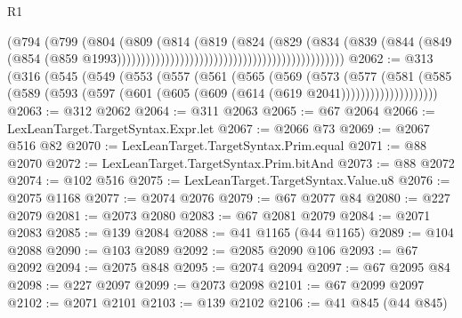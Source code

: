 \begin{lexlean}{R1}
\begin{coremodule}
                                                                      (@794
                                                                        (@799
                                                                          (@804
                                                                            (@809
                                                                              (@814
                                                                                (@819
                                                                                  (@824
                                                                                    (@829
                                                                                      (@834
                                                                                        (@839
                                                                                          (@844
                                                                                            (@849
                                                                                              (@854
                                                                                                (@859
                                                                                                  @1993)))))))))))))))))))))))))))))))))))))))))))))))
@2062 := @313
    (@316
      (@545
        (@549
          (@553
            (@557
              (@561
                (@565
                  (@569
                    (@573
                      (@577
                        (@581
                          (@585
                            (@589
                              (@593 (@597 (@601 (@605 (@609 (@614 (@619 @2041))))))))))))))))))))
@2063 := @312 @2062
@2064 := @311 @2063
@2065 := @67 @2064
@2066 := LexLeanTarget.TargetSyntax.Expr.let
@2067 := @2066 @73
@2069 := @2067 @516 @82
@2070 := LexLeanTarget.TargetSyntax.Prim.equal
@2071 := @88 @2070
@2072 := LexLeanTarget.TargetSyntax.Prim.bitAnd
@2073 := @88 @2072
@2074 := @102 @516
@2075 := LexLeanTarget.TargetSyntax.Value.u8
@2076 := @2075 @1168
@2077 := @2074 @2076
@2079 := @67 @2077 @84
@2080 := @227 @2079
@2081 := @2073 @2080
@2083 := @67 @2081 @2079
@2084 := @2071 @2083
@2085 := @139 @2084
@2088 := @41 @1165 (@44 @1165)
@2089 := @104 @2088
@2090 := @103 @2089
@2092 := @2085 @2090 @106
@2093 := @67 @2092
@2094 := @2075 @848
@2095 := @2074 @2094
@2097 := @67 @2095 @84
@2098 := @227 @2097
@2099 := @2073 @2098
@2101 := @67 @2099 @2097
@2102 := @2071 @2101
@2103 := @139 @2102
@2106 := @41 @845 (@44 @845)

\end{coremodule}
\end{lexlean}
